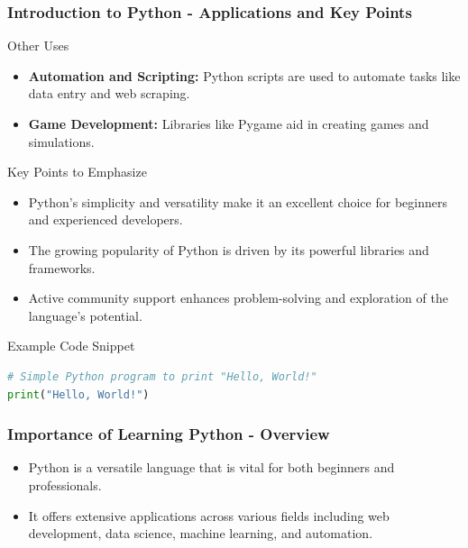 \documentclass{beamer}
\begin{document}
\begin{frame}[fragile]
    \frametitle{Introduction to Python - Applications and Key Points}
    \begin{block}{Other Uses}
        \begin{itemize}
            \item \textbf{Automation and Scripting:} Python scripts are used to automate tasks like data entry and web scraping. 
            \item \textbf{Game Development:} Libraries like Pygame aid in creating games and simulations.
        \end{itemize}
    \end{block}
    
    \begin{block}{Key Points to Emphasize}
        \begin{itemize}
            \item Python's simplicity and versatility make it an excellent choice for beginners and experienced developers.
            \item The growing popularity of Python is driven by its powerful libraries and frameworks.
            \item Active community support enhances problem-solving and exploration of the language's potential.
        \end{itemize}
    \end{block}
    
    \begin{block}{Example Code Snippet}
        \begin{lstlisting}[language=Python]
# Simple Python program to print "Hello, World!"
print("Hello, World!")
        \end{lstlisting}
    \end{block}
\end{frame}

\begin{frame}[fragile]
    \frametitle{Importance of Learning Python - Overview}
    \begin{itemize}
        \item Python is a versatile language that is vital for both beginners and professionals.
        \item It offers extensive applications across various fields including web development, data science, machine learning, and automation.
    \end{itemize}
\end{frame}
\end{document}
